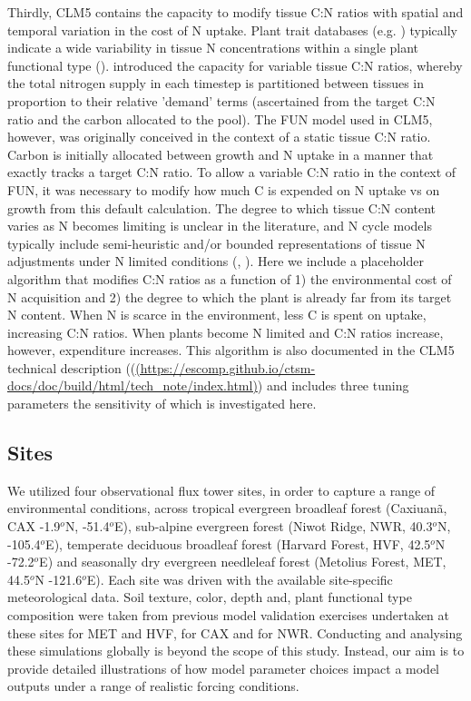 \documentclass[draft,linenumbers]{agujournal}
\begin{document}
Thirdly, CLM5 contains the capacity to modify tissue C:N ratios with spatial and temporal variation in the cost of N uptake.  Plant trait databases (e.g. \cite{kattge2011}) typically indicate a wide variability in tissue N concentrations within a single plant functional type (\cite{wright2005}). \cite{ghimire2016} introduced the capacity for variable tissue C:N ratios, whereby the total nitrogen supply in each timestep is partitioned between tissues in proportion to their relative 'demand' terms (ascertained from the target C:N ratio and the carbon allocated to the pool).  The FUN model used in CLM5, however, was originally conceived in the context of a static tissue C:N ratio. Carbon is initially allocated between growth and N uptake in a manner that exactly tracks a target C:N ratio. To allow a variable C:N ratio in the context of FUN, it was necessary to modify how much C is expended on N uptake vs on growth from this default calculation. The degree to which tissue C:N content varies as N becomes limiting is unclear in the literature, and N cycle models typically include semi-heuristic and/or bounded representations of tissue N adjustments under N limited conditions (\cite{zaehle2010}, \cite{ghimire2016}). Here we include a placeholder algorithm that modifies C:N ratios as a function of 1) the environmental cost of N acquisition and 2) the degree to which the plant is already far from its target N content. When N is scarce in the environment, less C is spent on uptake, increasing C:N ratios. When plants become N limited and C:N ratios increase, however, expenditure increases. This algorithm is also documented in the CLM5 technical description ((\url{(https://escomp.github.io/ctsm-docs/doc/build/html/tech_note/index.html)}) and includes three tuning parameters the sensitivity of which is investigated here.

\subsection{Sites}
We utilized four observational flux tower sites, in order to capture a range of environmental conditions, across tropical evergreen broadleaf forest (Caxiuan\~a, CAX -1.9$^{o}$N, -51.4$^{o}$E),  sub-alpine evergreen forest (Niwot Ridge, NWR, 40.3$^{o}$N, -105.4$^{o}$E), temperate deciduous broadleaf forest (Harvard Forest, HVF, 42.5$^{o}$N -72.2$^{o}$E) and seasonally dry evergreen needleleaf forest (Metolius Forest, MET, 44.5$^{o}$N -121.6$^{o}$E).  Each site was driven with the available site-specific meteorological data. Soil texture, color, depth and, plant functional type composition were taken from previous model validation exercises undertaken at these sites \cite{bonan2012} for MET and HVF,  \cite{fisher2007} for CAX and \cite{bonan2013} for NWR.    Conducting and analysing these simulations globally is beyond the scope of this study.  Instead, our aim is to provide detailed illustrations of how model parameter choices impact a model outputs under a range of realistic forcing conditions.  
\end{document}
